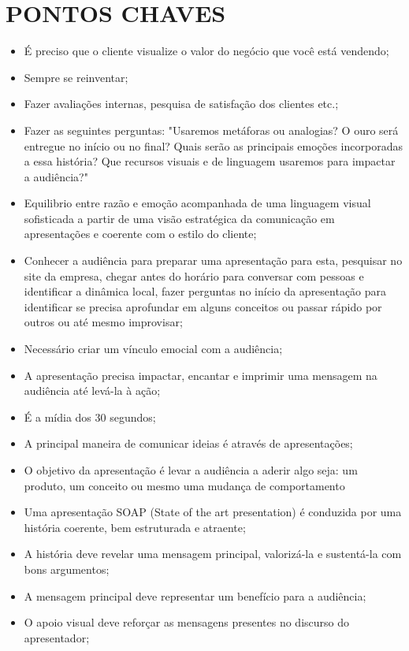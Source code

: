 \chapter{PONTOS CHAVES}
\label{chap:keypoints}
\begin{itemize}
    \item É preciso que o cliente visualize o valor do negócio que você está vendendo;
    \item Sempre se reinventar; 
    \item Fazer avaliações internas, pesquisa de satisfação dos clientes etc.;
    \item Fazer as seguintes perguntas: "Usaremos metáforas ou analogias? O ouro será entregue no início ou no final? Quais serão as principais emoções incorporadas a essa história? Que recursos visuais e de linguagem usaremos para impactar a audiência?"
    \item Equilibrio entre razão e emoção acompanhada de uma linguagem visual sofisticada a partir de uma visão estratégica da comunicação em apresentações e coerente com o estilo do cliente;
    \item Conhecer a audiência para preparar uma apresentação para esta, pesquisar no site da empresa, chegar antes do horário para conversar com pessoas e identificar a dinâmica local, fazer perguntas no início da apresentação para identificar se precisa aprofundar em alguns conceitos ou passar rápido por outros ou até mesmo improvisar;
    \item Necessário criar um vínculo emocial com a audiência;
    \item A apresentação precisa impactar, encantar e imprimir uma mensagem na audiência até levá-la à ação;
    \item É a mídia dos 30 segundos;
    \item A principal maneira de comunicar ideias é através de apresentações;
    \item O objetivo da apresentação é levar a audiência a aderir algo seja: um produto, um conceito ou mesmo uma mudança de comportamento
    \item Uma apresentação SOAP (State of the art presentation) é conduzida por uma história coerente, bem estruturada e atraente;
    \item A história deve revelar uma mensagem principal, valorizá-la e sustentá-la com bons argumentos;
    \item A mensagem principal deve representar um benefício para a audiência;
    \item O apoio visual deve reforçar as mensagens presentes no discurso do apresentador;

\end{itemize}
